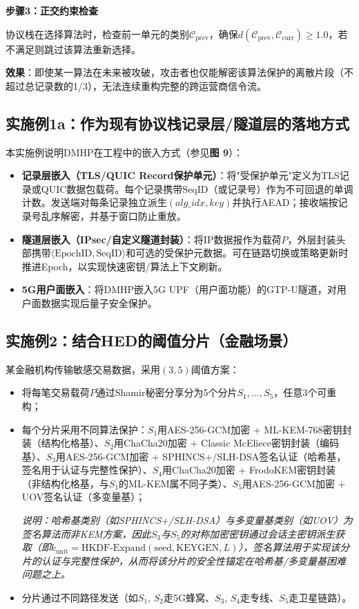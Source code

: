 ﻿\documentclass[12pt,a4paper]{article}
\begin{document}
\textbf{步骤3：正交约束检查}

协议栈在选择算法时，检查前一单元的类别$\mathcal{C}_{\text{prev}}$，确保$d(\mathcal{C}_{\text{prev}}, \mathcal{C}_{\text{curr}}) \geq 1.0$，若不满足则跳过该算法重新选择。

\textbf{效果}：即使某一算法在未来被攻破，攻击者也仅能解密该算法保护的离散片段（不超过总记录数的1/3），无法连续重构完整的跨运营商信令流。

\subsection{实施例1a：作为现有协议栈记录层/隧道层的落地方式}

本实施例说明DMHP在工程中的嵌入方式（参见\textbf{图 9}）：

\begin{itemize}
    \item \textbf{记录层嵌入（TLS/QUIC Record保护单元）}：将"受保护单元"定义为TLS记录或QUIC数据包载荷。每个记录携带$\text{SeqID}$（或记录号）作为不可回退的单调计数。发送端对每条记录独立派生$(alg\_idx, key)$并执行AEAD；接收端按记录号乱序解密，并基于窗口防止重放。
    \item \textbf{隧道层嵌入（IPsec/自定义隧道封装）}：将IP数据报作为载荷$P$，外层封装头部携带$\langle\text{EpochID},\text{SeqID}\rangle$和可选的受保护元数据。可在链路切换或策略更新时推进Epoch，以实现快速密钥/算法上下文刷新。
    \item \textbf{5G用户面嵌入}：将DMHP嵌入5G UPF（用户面功能）的GTP-U隧道，对用户面数据实现后量子安全保护。
\end{itemize}

\subsection{实施例2：结合HED的阈值分片（金融场景）}

某金融机构传输敏感交易数据，采用$(3,5)$阈值方案：

\begin{itemize}
    \item 将每笔交易载荷$P$通过Shamir秘密分享分为5个分片$S_1, \ldots, S_5$，任意3个可重构；
    \item 每个分片采用不同算法保护：$S_1$用AES-256-GCM加密 + ML-KEM-768密钥封装（结构化格基）、$S_2$用ChaCha20加密 + Classic McEliece密钥封装（编码基）、$S_3$用AES-256-GCM加密 + SPHINCS+/SLH-DSA签名认证（哈希基，签名用于认证与完整性保护）、$S_4$用ChaCha20加密 + FrodoKEM密钥封装（非结构化格基，与$S_1$的ML-KEM属不同子类）、$S_5$用AES-256-GCM加密 + UOV签名认证（多变量基）；

    \textit{说明：哈希基类别（如SPHINCS+/SLH-DSA）与多变量基类别（如UOV）为签名算法而非KEM方案，因此$S_3$与$S_5$的对称加密密钥通过会话主密钥派生获取（即$k_{\text{unit}} = \text{HKDF-Expand}(\text{seed}, \text{KEYGEN}, L)$），签名算法用于实现该分片的认证与完整性保护，从而将该分片的安全性锚定在哈希基/多变量基困难问题之上。}
    \item 分片通过不同路径发送（如$S_1$, $S_2$走5G蜂窝、$S_3$, $S_4$走专线、$S_5$走卫星链路）。
\end{itemize}
\end{document}

